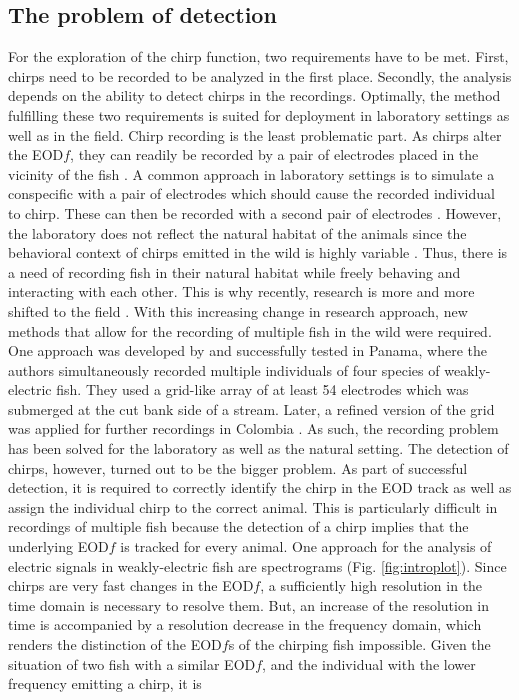 \subsection{The problem of detection}
For the exploration of the chirp function, two requirements have to be met. First, chirps need to be recorded to be analyzed in the first place. Secondly, the analysis depends on the ability to detect chirps in the recordings. Optimally, the method fulfilling these two requirements is suited for deployment in laboratory settings as well as in the field. Chirp recording is the least problematic part. As chirps alter the EOD$f$, they can readily be recorded by a pair of electrodes placed in the vicinity of the fish \parencite{bendaPhysicsElectrosensoryWorlds2020}. A common approach in laboratory settings is to simulate a conspecific with a pair of electrodes which should cause the recorded individual to chirp. These can then be recorded with a second pair of electrodes \parencite{zupanc1993evoked, hagedornCourtSparkElectric1985a, dunlapDiversityStructureElectrocommunication2003, englerSpontaneousModulationsElectric2000a}. However, the laboratory does not reflect the natural habitat of the animals since the behavioral context of chirps emitted in the wild is highly variable \parencite{henningerStatisticsNaturalCommunication2018}. Thus, there is a need of recording fish in their natural habitat while freely behaving and interacting with each other. This is why recently, research is more and more shifted to the field \parencite{henningerStatisticsNaturalCommunication2018, fugere2011electrical, zubizarreta2020seasonal}. With this increasing change in research approach, new methods that allow for the recording of multiple fish in the wild were required. One approach was developed by \textcite{henningerStatisticsNaturalCommunication2018} and successfully tested in Panama, where the authors simultaneously recorded multiple individuals of four species of weakly-electric fish. They used a grid-like array of at least 54 electrodes which was submerged at the cut bank side of a stream. Later, a refined version of the grid was applied for further recordings in Colombia \parencite{raab2022AdvancesNoninvasiveTracking}. As such, the recording problem has been solved for the laboratory as well as the natural setting. The detection of chirps, however, turned out to be the bigger problem. As part of successful detection, it is required to correctly identify the chirp in the EOD track as well as assign the individual chirp to the correct animal. This is particularly difficult in recordings of multiple fish because the detection of a chirp implies that the underlying EOD$f$ is tracked for every animal. One approach for the analysis of electric signals in weakly-electric fish are spectrograms (Fig. \ref{fig:introplot}). Since chirps are very fast changes in the EOD$f$, a sufficiently high resolution in the time domain is necessary to resolve them. But, an increase of the resolution in time is accompanied by a resolution decrease in the frequency domain, which renders the distinction of the EOD$f$s of the chirping fish impossible. Given the situation of two fish with a similar EOD$f$, and the individual with the lower frequency emitting a chirp, it is 
